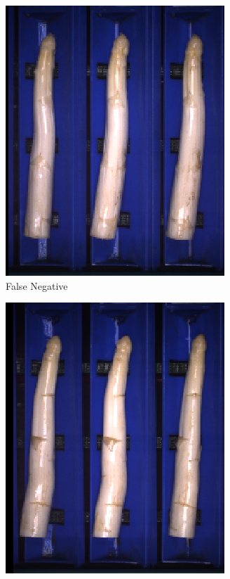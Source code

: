 \begin{figure}[h]
	\centering
	\begin{subfigure}{0.3\textwidth}
		\includegraphics[width=0.9\linewidth]{Figures/appendix/rustybody_falsenegative_01.png}
		\vspace{-5pt}
		\caption{False Negative}
	\end{subfigure}
	\begin{subfigure}{0.3\textwidth}
		\includegraphics[width=0.9\linewidth]{Figures/appendix/rustybody_falsenegative_02.png}

\end{subfigure}
\end{figure}

